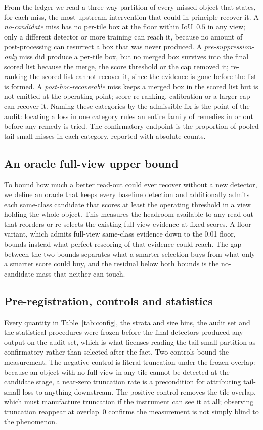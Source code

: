 From the ledger we read a three-way partition of every missed object that states, for each miss, the most upstream intervention that could in principle recover it. A \emph{no-candidate} miss has no per-tile box at the floor within IoU~$0.5$ in any view; only a different detector or more training can reach it, because no amount of post-processing can resurrect a box that was never produced. A \emph{pre-suppression-only} miss did produce a per-tile box, but no merged box survives into the final scored list because the merge, the score threshold or the cap removed it; re-ranking the scored list cannot recover it, since the evidence is gone before the list is formed. A \emph{post-hoc-recoverable} miss keeps a merged box in the scored list but is not emitted at the operating point; score re-ranking, calibration or a larger cap can recover it. Naming these categories by the admissible fix is the point of the audit: locating a loss in one category rules an entire family of remedies in or out before any remedy is tried. The confirmatory endpoint is the proportion of pooled tail-small misses in each category, reported with absolute counts.

\subsection{An oracle full-view upper bound}\label{sec:oracle}

To bound how much a better read-out could ever recover without a new detector, we define an oracle that keeps every baseline detection and additionally admits each same-class candidate that scores at least the operating threshold in a view holding the whole object. This measures the headroom available to any read-out that reorders or re-selects the existing full-view evidence at fixed scores. A floor variant, which admits full-view same-class evidence down to the 0.01 floor, bounds instead what perfect rescoring of that evidence could reach. The gap between the two bounds separates what a smarter selection buys from what only a smarter score could buy, and the residual below both bounds is the no-candidate mass that neither can touch.

\subsection{Pre-registration, controls and statistics}\label{sec:prereg}

Every quantity in Table~\ref{tab:config}, the strata and size bins, the audit set and the statistical procedures were frozen before the final detectors produced any output on the audit set, which is what licenses reading the tail-small partition as confirmatory rather than selected after the fact. Two controls bound the measurement. The negative control is literal truncation under the frozen overlap: because an object with no full view in any tile cannot be detected at the candidate stage, a near-zero truncation rate is a precondition for attributing tail-small loss to anything downstream. The positive control removes the tile overlap, which must manufacture truncation if the instrument can see it at all; observing truncation reappear at overlap~0 confirms the measurement is not simply blind to the phenomenon.

